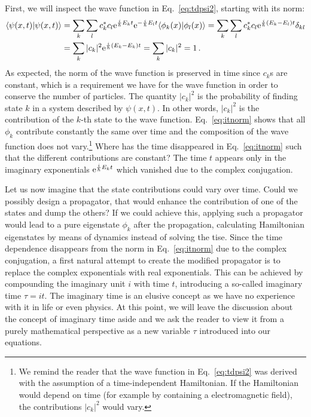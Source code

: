 First, we will inspect the wave function in Eq.~\eqref{eq:tdpsi2}, starting with its norm:
\begin{align}
    \langle\psi(x,t)|\psi(x,t)\rangle &= \sum_k \sum_l c_k^* c_l  \mathrm{e}^{\frac{i}{\hbar}E_k t} \mathrm{e}^{-\frac{i}{\hbar}E_l t} \langle\phi_k(x)|\phi_l(x)\rangle = \sum_k \sum_l c_k^* c_l  \mathrm{e}^{\frac{i}{\hbar}(E_k - E_l) t} \delta_{kl} \notag \\
    &= \sum_k |c_k|^2  \mathrm{e}^{\frac{i}{\hbar}(E_k - E_k) t} =  \sum_k |c_k|^2 = 1 \, .
    \label{eq:itnorm}
\end{align}
As expected, the norm of the wave function is preserved in time since $c_k$s are constant, which is a requirement we have for the wave function in order to conserve the number of particles. The quantity $|c_k|^2$ is the probability of finding state $k$ in a system described by $\psi(x,t)$. In other words, $|c_k|^2$ is the contribution of the $k$-th state to the wave function. Eq.~\eqref{eq:itnorm} shows that all $\phi_k$ contribute constantly the same over time and the composition of the wave function does not vary.\footnote{We remind the reader that the wave function in Eq.~\eqref{eq:tdpsi2} was derived with the assumption of a time-independent Hamiltonian. If the Hamiltonian would depend on time (for example by containing a electromagnetic field), the contributions $|c_k|^2$ would vary.}
Where has the time disappeared in Eq.~\eqref{eq:itnorm} such that the different contributions are constant? The time $t$ appears only in the imaginary exponentials $\mathrm{e}^{\frac{i}{\hbar}E_k t}$ which vanished due to the complex conjugation. 

Let us now imagine that the state contributions could vary over time. Could we possibly design a propagator, that would enhance the contribution of one of the states and dump the others? If we could achieve this, applying such a propagator would lead to a pure eigenstate $\phi_k$ after the propagation, calculating Hamiltonian eigenstates by means of dynamics instead of solving the \acrlong{tise}. 
Since the time dependence disappears from the norm in Eq.~\eqref{eq:itnorm} due to the complex conjugation, a first natural attempt to create the modified propagator is to replace the complex exponentials with real exponentials. This can be achieved by compounding the imaginary unit $i$ with time $t$, introducing a so-called imaginary time $\tau=it$. The imaginary time is an elusive concept as we have no experience with it in life or even physics. At this point, we will leave the discussion about the concept of imaginary time aside and we ask the reader to view it from a purely mathematical perspective as a new variable $\tau$ introduced into our equations.



